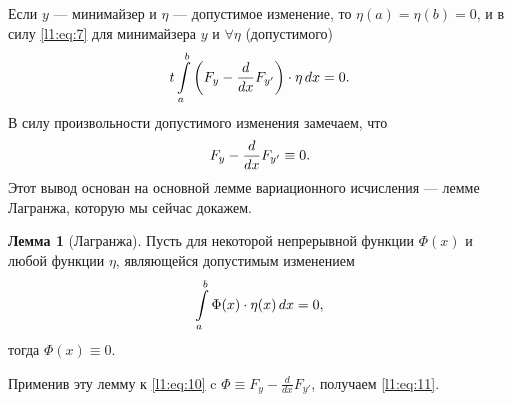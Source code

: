 \documentclass[12pt,a4paper,openany,fleqn]{book}
\newcommand{\der}[2]{\ensuremath{\frac{d#1}{d#2}}}
\newcommand{\dd}{\ensuremath{d}}
\theoremstyle{definition}
\newtheorem{_lemm}{Лемма}[section]
\begin{document}
	Если $y$ --- минимайзер и $\eta$ --- допустимое изменение, то $\eta(a)=\eta(b)=0$, и в силу \eqref{l1:eq:7} для минимайзера $y$ и $\forall\eta$  (допустимого)
	\begin{equation}
		\label{l1:eq:10}
		\hfill t\int\limits_a^b\left(F_y-\der{}{x}F_{y'}\right)\cdot\eta\,\dd{x}=0.\hfill
	\end{equation}
	В силу произвольности допустимого изменения замечаем, что 
	\begin{equation}
		\label{l1:eq:11}
		\hfill F_y-\der{}{x}F_{y'}\equiv0.\hfill
	\end{equation}
	Этот вывод основан на основной лемме вариационного исчисления --- лемме Лагранжа, которую мы сейчас докажем.
	\begin{_lemm}[Лагранжа]
		Пусть для некоторой непрерывной функции $\Phi(x)$ и любой функции $\eta$, являющейся допустимым изменением
		\begin{equation}
			\label{l1:eq:12}
			\hfill\int\limits_a^b \Phi(x)\cdot\eta(x)\,\dd{x}=0,\hfill
		\end{equation}
		тогда $\Phi(x)\equiv0$.
	\end{_lemm}
	\noindent Применив эту лемму к \eqref{l1:eq:10} c $\Phi\equiv F_y-\der{}{x}F_{y'}$, получаем \eqref{l1:eq:11}.
\end{document}
